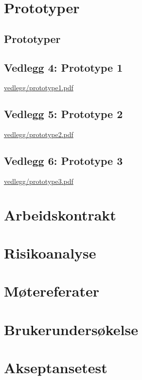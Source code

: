 \begin{sloppypar}
\section{\textbf{Prototyper}}
\subsection{\textbf{Prototyper}}
\subsection{\textbf{Vedlegg 4:} Prototype 1}
\url{vedlegg/prototype1.pdf}
\subsection{\textbf{Vedlegg 5:} Prototype 2}
\url{vedlegg/prototype2.pdf}
\subsection{\textbf{Vedlegg 6:} Prototype 3}
\url{vedlegg/prototype3.pdf}
\end{sloppypar}

\section{Arbeidskontrakt}


\section{Risikoanalyse}

\section{Møtereferater}


\section{Brukerundersøkelse}


\section{Akseptansetest}